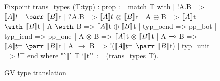 \begin{figure}
\begin{coq}
Fixpoint trans_types (T:typ) : prop :=
  match T with
    | !A.B => $\llbracket A \rrbracket t^\bot$ $\parr$ $\llbracket B \rrbracket$t
    | ?A.B => $\llbracket A \rrbracket t$ $\otimes$ $\llbracket B \rrbracket$t
    | A $\oplus$ B => $\llbracket A \rrbracket$t $\with$ $\llbracket B \rrbracket$t
    | A $\with$ B => $\llbracket A \rrbracket$t $\oplus$ $\llbracket B \rrbracket$t
    | typ_oend => pp_bot
    | typ_iend => pp_one
    | A $\otimes$ B => $\llbracket A \rrbracket$t $\otimes$ $\llbracket B \rrbracket$t
    | A $\multimap$ B => $\llbracket A \rrbracket t^\bot$ $\parr$ $\llbracket B \rrbracket$t
    | A $\to$ B => !($\llbracket A \rrbracket t^\bot$ $\parr$ $\llbracket B \rrbracket$t)
    | typ_unit => !$\top$
  end
where "`$\llbracket$' T `$\rrbracket$t'" := (trans_types T).
\end{coq}
\caption{GV type translation}
\label{fig:typtrans}
\end{figure}
